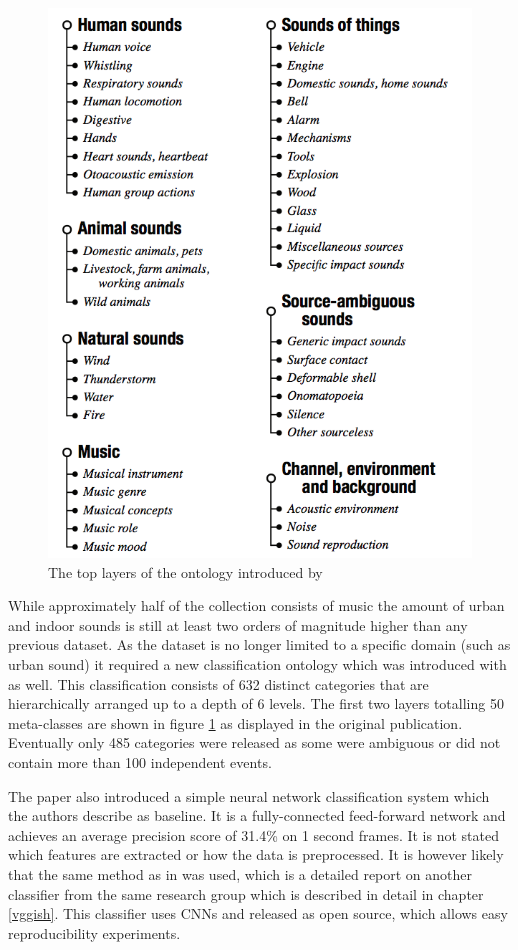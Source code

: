 \begin{figure}
    \centering
    \vspace{-10pt}
	\includegraphics[width=.45\textwidth]{./images/illustrations/audioset}
    \caption{The top layers of the ontology introduced by \cite{45857}}
	\label{fig:audioset}
\end{figure}


While approximately half of the collection consists of music the amount of urban and indoor sounds is still at least two orders of magnitude higher than any previous dataset. As the dataset is no longer limited to a specific domain (such as urban sound) it required a new classification ontology which was introduced with \cite{45857} as well. This classification consists of 632 distinct categories that are hierarchically arranged up to a depth of 6 levels. The first two layers totalling 50 meta-classes are shown in figure \ref{fig:audioset} as displayed in the original publication. Eventually only 485 categories were released as some were ambiguous or did not contain more than 100 independent events.

The paper also introduced a simple neural network classification system which the authors describe as baseline. It is a fully-connected feed-forward network and achieves an average precision score of 31.4\% on 1 second frames. It is not stated which features are extracted or how the data is preprocessed. It is however likely that the same method as in \cite{45611} was used, which is a detailed report on another classifier from the same research group which is described in detail in chapter \ref{vggish}. This classifier uses CNNs and released as open source, which allows easy reproducibility experiments.



